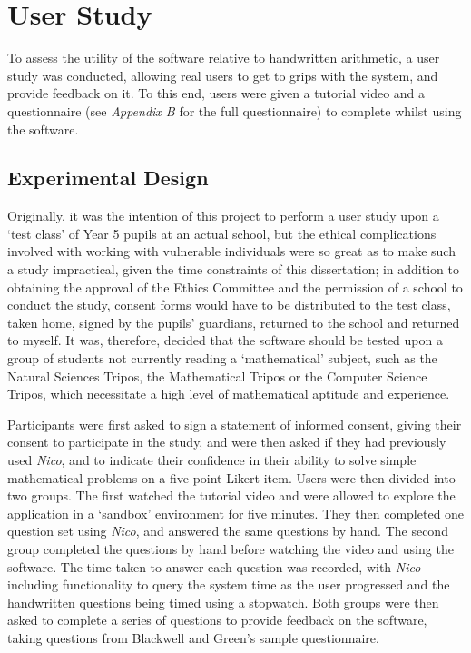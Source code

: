 \documentclass[12pt,twoside,notitlepage,xetex]{report}
\begin{document}
%
\section{User Study}

To assess the utility of the software relative to handwritten arithmetic, a
user study was conducted, allowing real users to get to grips with the system,
and provide feedback on it.  To this end, users were given a tutorial video and
a questionnaire (see \emph{Appendix B} for the full questionnaire) to complete
whilst using the software.

\subsection{Experimental Design}

Originally, it was the intention of this project to perform a user study upon
a `test class' of Year 5 pupils at an actual school, but the ethical
complications involved with working with vulnerable individuals were so great
as to make such a study impractical, given the time constraints of this
dissertation; in addition to obtaining the approval of the Ethics Committee and
the permission of a school to conduct the study, consent forms would have to be
distributed to the test class, taken home, signed by the pupils' guardians,
returned to the school and returned to myself.  It was, therefore, decided that
the software should be tested upon a group of students not currently reading a
`mathematical' subject, such as the Natural Sciences Tripos, the Mathematical
Tripos or the Computer Science Tripos, which necessitate a high level of
mathematical aptitude and experience.

Participants were first asked to sign a statement of informed consent, giving
their consent to participate in the study, and were then asked if they had
previously used \emph{Nico}, and to indicate their confidence in their ability
to solve simple mathematical problems on a five-point Likert item.  Users were
then divided into two groups.  The first watched the tutorial video and were
allowed to explore the application in a `sandbox' environment for five
minutes.  They then completed one question set using \emph{Nico}, and answered
the same questions by hand.  The second group completed the questions by hand
before watching the video and using the software.  The time taken to answer
each question was recorded, with \emph{Nico} including functionality to query
the system time as the user progressed and the handwritten questions being
timed using a stopwatch.  Both groups were then asked to complete a series of
questions to provide feedback on the software, taking questions from Blackwell
and Green's sample questionnaire. \cite{Blackwell2000}
\end{document}
